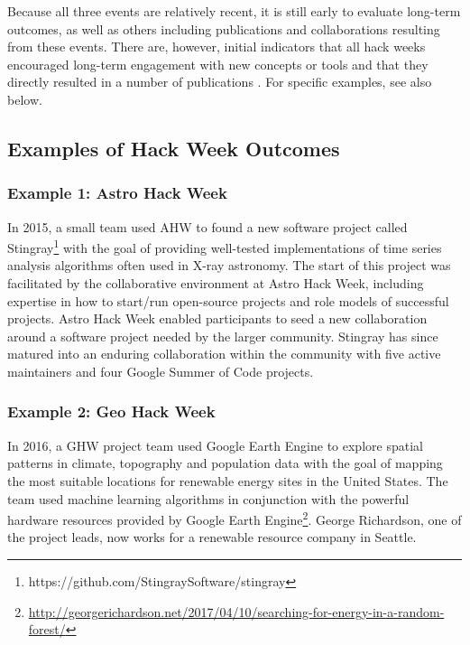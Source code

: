 Because all three events are relatively recent, it is still early to evaluate long-term outcomes, as well as others including publications and collaborations resulting from these events.
There are, however, initial indicators that all hack weeks encouraged long-term engagement with new concepts or tools and that they directly resulted in a number of publications \cite{gullysantiago2015,faria2016,keshavan2017,leonard2017,jordan2017,peterson2017,hahn2017,pricewhelan2017}. For specific examples, see also below.

\subsection*{Examples of Hack Week Outcomes}
\label{sec:outcomes}
\subsubsection*{Example 1: Astro Hack Week}
In 2015, a small team used AHW to found a new software project called Stingray\footnote{https://github.com/StingraySoftware/stingray} with the goal of providing well-tested implementations of time series analysis algorithms often used in X-ray astronomy.
The start of this project was facilitated by the collaborative environment at Astro Hack Week, including expertise in how to start/run open-source projects and role models of successful projects. Astro Hack Week enabled participants to seed a new collaboration around a software project needed by the larger community.
Stingray has since matured into an enduring collaboration within the community with five active maintainers and four Google Summer of Code projects.
\subsubsection*{Example 2: Geo Hack Week}
In 2016, a GHW project team used Google Earth Engine to explore spatial patterns in climate, topography and population data with the goal of mapping the most suitable locations for renewable energy sites in the United States.
The team used machine learning algorithms in conjunction with the powerful hardware resources provided by Google Earth Engine\footnote{\url{http://georgerichardson.net/2017/04/10/searching-for-energy-in-a-random-forest/}}.
George Richardson, one of the project leads, now works for a renewable resource company in Seattle.
